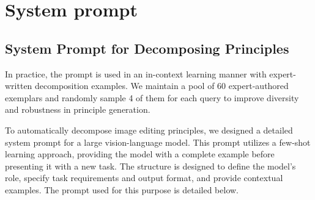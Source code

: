 \section{System prompt}
\subsection{System Prompt for Decomposing Principles}
\label{sec:appendix_prompt}
In practice, the prompt is used in an in-context learning manner with expert-written decomposition examples. We maintain a pool of 60 expert-authored exemplars and randomly sample 4 of them for each query to improve diversity and robustness in principle generation.


To automatically decompose image editing principles, we designed a detailed system prompt for a large vision-language model. This prompt utilizes a few-shot learning approach, providing the model with a complete example before presenting it with a new task. The structure is designed to define the model's role, specify task requirements and output format, and provide contextual examples. The prompt used for this purpose is detailed below.
